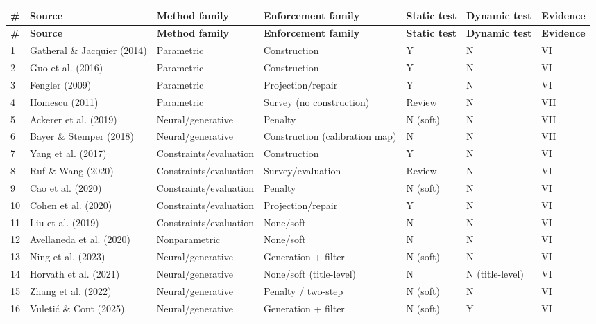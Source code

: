 \documentclass[11pt]{article}
\begin{document}
\begingroup\scriptsize
\begin{longtable}{@{}p{}p{}p{}p{}p{}p{}p{}@{}}
\toprule
\textbf{\#} & \textbf{Source} & \textbf{Method family} & \textbf{Enforcement family} & \textbf{Static test} & \textbf{Dynamic test} & \textbf{Evidence} \\
\midrule
\endfirsthead
\toprule
\textbf{\#} & \textbf{Source} & \textbf{Method family} & \textbf{Enforcement family} & \textbf{Static test} & \textbf{Dynamic test} & \textbf{Evidence} \\
\midrule
\endhead
1 & Gatheral \& Jacquier (2014) & Parametric & Construction & Y & N & VI \\
2 & Guo et al. (2016) & Parametric & Construction & Y & N & VI \\
3 & Fengler (2009) & Parametric & Projection/repair & Y & N & VI \\
4 & Homescu (2011) & Parametric & Survey (no construction) & Review & N & VII \\
5 & Ackerer et al. (2019) & Neural/generative & Penalty & N (soft) & N & VII \\
6 & Bayer \& Stemper (2018) & Neural/generative & Construction (calibration map) & N & N & VII \\
7 & Yang et al. (2017) & Constraints/evaluation & Construction & Y & N & VI \\
8 & Ruf \& Wang (2020) & Constraints/evaluation & Survey/evaluation & Review & N & VI \\
9 & Cao et al. (2020) & Constraints/evaluation & Penalty & N (soft) & N & VI \\
10 & Cohen et al. (2020) & Constraints/evaluation & Projection/repair & Y & N & VI \\
11 & Liu et al. (2019) & Constraints/evaluation & None/soft & N & N & VI \\
12 & Avellaneda et al. (2020) & Nonparametric & None/soft & N & N & VI \\
13 & Ning et al. (2023) & Neural/generative & Generation + filter & N (soft) & N & VI \\
14 & Horvath et al. (2021) & Neural/generative & None/soft (title-level) & N & N (title-level) & VI \\
15 & Zhang et al. (2022) & Neural/generative & Penalty / two-step & N (soft) & N & VI \\
16 & Vuletić \& Cont (2025) & Neural/generative & Generation + filter & N (soft) & Y & VI \\

\end{longtable}
\end{document}
